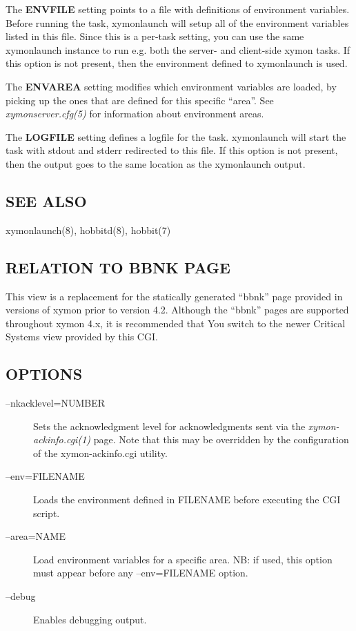   The \textbf{ENVFILE}
 setting points to a file with definitions of environment
 variables. Before running the task, xymonlaunch will setup all of
 the environment variables listed in this file. Since this is a
 per-task setting, you can use the same xymonlaunch instance to run
 e.g. both the server- and client-side xymon tasks. If this option is
 not present, then the environment defined to xymonlaunch is used. 



  The \textbf{ENVAREA}
 setting modifies which environment variables are loaded, by picking
 up the ones that are defined for this specific ``area''. See
 \emph{xymonserver.cfg(5)} for information about environment areas. 


  The \textbf{LOGFILE}
 setting defines a logfile for the task. xymonlaunch will start the
 task with stdout and stderr redirected to this file. If this option
 is not present, then the output goes to the same location as the
 xymonlaunch output. 



 
\subsection{SEE ALSO}
xymonlaunch(8), hobbitd(8), hobbit(7) 




 
\subsection{RELATION TO BBNK PAGE}
 This view is a replacement for the statically generated ``bbnk'' page
 provided in versions of xymon prior to version 4.2. Although the
 ``bbnk'' pages are supported throughout xymon 4.x, it is recommended
 that You switch to the newer Critical Systems view provided by this
 CGI. 


 
\subsection{OPTIONS}
\begin{description}
\item[--nkacklevel=NUMBER] Sets the acknowledgment level for
  acknowledgments sent via the \emph{xymon-ackinfo.cgi(1)} page. Note
  that this may be overridden by the configuration of the
  xymon-ackinfo.cgi utility. 


 

\item[--env=FILENAME] Loads the environment defined in FILENAME before
  executing the CGI script. 


 

\item[--area=NAME] Load environment variables for a specific area. NB:
  if used, this option must appear before any --env=FILENAME option. 


 

\item[--debug] Enables debugging output. 

 


\end{description}
